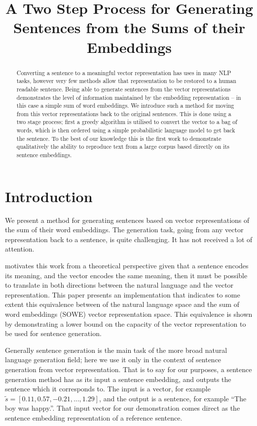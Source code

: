 \documentclass[compsoc]{IEEEtran}
\title{A Two Step Process for Generating Sentences from the Sums of their Embeddings}
\author{}
\theoremstyle{plain}
\theoremstyle{definition}
\begin{document}
\maketitle

\begin{abstract}

	
Converting a sentence to a meaningful vector representation has uses in many NLP tasks, however very few methods allow that representation to be restored to a human readable sentence. Being able to generate sentences from the vector representations demonstrates the level of information maintained by the embedding representation -- in this case a simple sum of word embeddings. We introduce such a method for moving from this vector representations back to the original sentences. This is done using a two stage process; first a greedy algorithm is utilised to convert the vector to a bag of words, which is then ordered using a simple probabilistic language model to get back the sentence. To the best of our knowledge this is the first work to demonstrate qualitatively the ability to reproduce text from a large corpus based directly on its sentence embeddings.
\end{abstract}

\section{Introduction} \label{intro}
We present a method for generating sentences based on vector representations of the sum of their word embeddings. The generation task, going from any vector representation back to a sentence, is quite challenging. It has not received a lot of attention.

\textcite{Dinu2014CompositionalGeneration} motivates this work from a theoretical perspective given that a sentence encodes its meaning, and the vector encodes the same meaning, then it must be possible to translate in both directions between the natural language and the vector representation. This paper presents an implementation that indicates to some extent this equivalence between of the natural language space and the sum of word embeddings (SOWE) vector representation space. This equivalence is shown by demonstrating a lower bound on the capacity of the vector representation to be used for sentence generation. 

Generally sentence generation is the main task of the more broad natural language generation field; here we use it only in the context of sentence generation from vector representation. That is to say for our purposes, a sentence generation method has as its input a sentence embedding, and outputs the sentence which it corresponds to. The input is a vector, for example $\tilde{s}=[0.11, 0.57,-0.21,...,1.29]$, and the output is a sentence, for example ``The boy was happy.''. That input vector for our demonstration comes direct as the sentence embedding representation of a reference sentence. 
\end{document}
